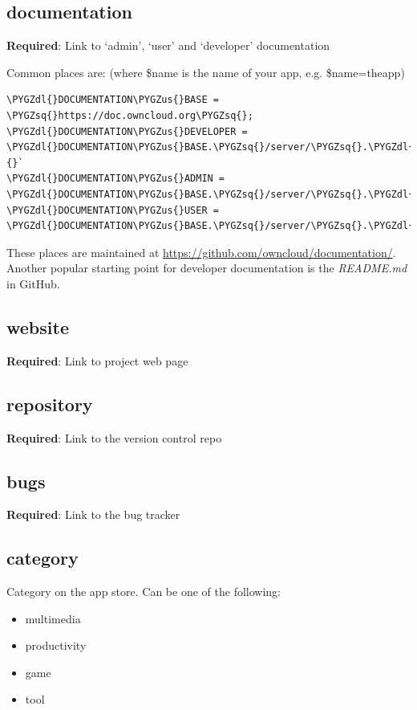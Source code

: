 \documentclass[letterpaper,10pt,english]{sphinxmanual}
\def\PYGZus{\char`\_}
\def\PYGZdl{\char`\$}
\def\PYGZsq{\char`\'}
\renewcommand\PYGZsq{\textquotesingle}
\begin{document}
\subsection{documentation}
\label{app/info:documentation}
\textbf{Required}: Link to `admin', `user' and `developer' documentation

Common places are: (where \$name is the name of your app, e.g. \$name=theapp)

\begin{Verbatim}[commandchars=\\\{\}]
\PYGZdl{}DOCUMENTATION\PYGZus{}BASE = \PYGZsq{}https://doc.owncloud.org\PYGZsq{};
\PYGZdl{}DOCUMENTATION\PYGZus{}DEVELOPER = \PYGZdl{}DOCUMENTATION\PYGZus{}BASE.\PYGZsq{}/server/\PYGZsq{}.\PYGZdl{}VERSIONS\PYGZus{}SERVER\PYGZus{}MAJOR\PYGZus{}DEV\PYGZus{}DOCS.\PYGZsq{}/developer\PYGZus{}manual/\PYGZdl{}name/\PYGZsq{};{}`
\PYGZdl{}DOCUMENTATION\PYGZus{}ADMIN = \PYGZdl{}DOCUMENTATION\PYGZus{}BASE.\PYGZsq{}/server/\PYGZsq{}.\PYGZdl{}VERSIONS\PYGZus{}SERVER\PYGZus{}MAJOR\PYGZus{}STABLE.\PYGZsq{}/admin\PYGZus{}manual/\PYGZdl{}name/\PYGZsq{};
\PYGZdl{}DOCUMENTATION\PYGZus{}USER = \PYGZdl{}DOCUMENTATION\PYGZus{}BASE.\PYGZsq{}/server/\PYGZsq{}.\PYGZdl{}VERSIONS\PYGZus{}SERVER\PYGZus{}MAJOR\PYGZus{}STABLE.\PYGZsq{}/user\PYGZus{}manual/\PYGZdl{}name/\PYGZsq{};
\end{Verbatim}

These places are maintained at \href{https://github.com/owncloud/documentation/}{https://github.com/owncloud/documentation/}.
Another popular starting point for developer documentation is the \emph{README.md} in GitHub.


\subsection{website}
\label{app/info:website}
\textbf{Required}: Link to project web page


\subsection{repository}
\label{app/info:repository}
\textbf{Required}: Link to the version control repo


\subsection{bugs}
\label{app/info:bugs}
\textbf{Required}: Link to the bug tracker


\subsection{category}
\label{app/info:category}
Category on the app store. Can be one of the following:
\begin{itemize}
\item {} 
multimedia

\item {} 
productivity

\item {} 
game

\item {} 
tool

\end{itemize}
\end{document}
